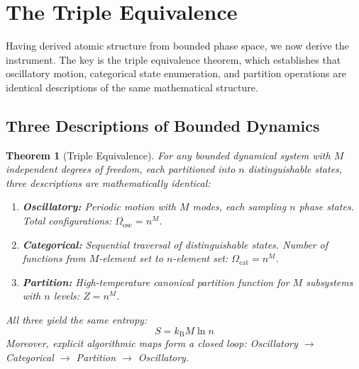 \documentclass[11pt,twocolumn,a4paper]{article}
\newtheorem{theorem}{Theorem}[section]
\theoremstyle{definition}
\theoremstyle{remark}
\newcommand{\kB}{k_{\mathrm{B}}}
\begin{document}
\section{The Triple Equivalence}
\label{sec:triple_equivalence}

Having derived atomic structure from bounded phase space, we now derive the instrument. The key is the triple equivalence theorem, which establishes that oscillatory motion, categorical state enumeration, and partition operations are identical descriptions of the same mathematical structure.

\subsection{Three Descriptions of Bounded Dynamics}

\begin{theorem}[Triple Equivalence]
\label{thm:triple}
For any bounded dynamical system with $M$ independent degrees of freedom, each partitioned into $n$ distinguishable states, three descriptions are mathematically identical:
\begin{enumerate}
\item \textbf{Oscillatory:} Periodic motion with $M$ modes, each sampling $n$ phase states. Total configurations: $\Omega_{\mathrm{osc}} = n^M$.
\item \textbf{Categorical:} Sequential traversal of distinguishable states. Number of functions from $M$-element set to $n$-element set: $\Omega_{\mathrm{cat}} = n^M$.
\item \textbf{Partition:} High-temperature canonical partition function for $M$ subsystems with $n$ levels: $Z = n^M$.
\end{enumerate}
All three yield the same entropy:
\begin{equation}
S = \kB M \ln n
\label{eq:triple_entropy}
\end{equation}
Moreover, explicit algorithmic maps form a closed loop: Oscillatory $\to$ Categorical $\to$ Partition $\to$ Oscillatory.
\end{theorem}
\end{document}
